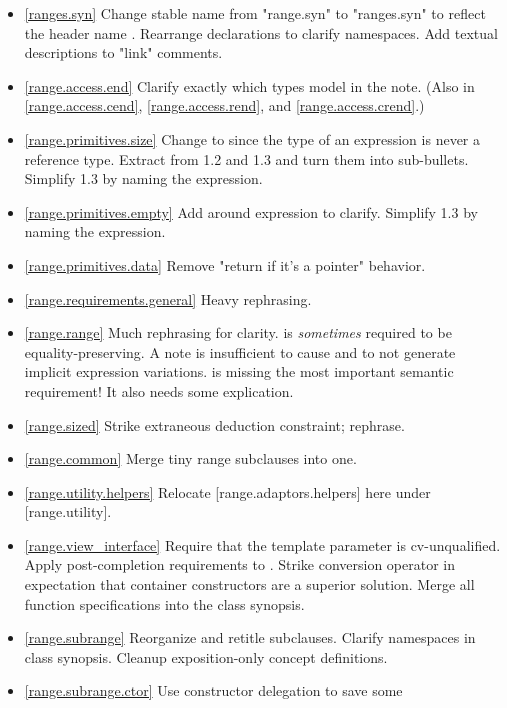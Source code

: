 \begin{itemize}
\item \ref{ranges.syn} Change stable name from "range.syn" to "ranges.syn" to
  reflect the header name .
  Rearrange declarations to clarify namespaces.
  Add textual descriptions to "link" comments.
\item \ref{range.access.end} Clarify exactly which types model 
  in the note. (Also in \ref{range.access.cend}, \ref{range.access.rend},
  and \ref{range.access.crend}.)
\item \ref{range.primitives.size} Change  to
   since the type of an expression is never a reference type.
  Extract  from 1.2 and 1.3 and turn them into
  sub-bullets. Simplify 1.3 by naming the expression.
\item \ref{range.primitives.empty} Add \tcode{()} around expression to clarify.
   Simplify 1.3 by naming the expression.
\item \ref{range.primitives.data}
  Remove "return  if it's a pointer" behavior.
\item \ref{range.requirements.general} Heavy rephrasing.
\item \ref{range.range} Much rephrasing for clarity.
   is \textit{sometimes} required to be equality-preserving.
  A note is insufficient to cause  and 
  to not generate implicit expression variations.
   is missing the most important
  semantic requirement! It also needs some explication.
\item \ref{range.sized} Strike extraneous deduction constraint; rephrase.
\item \ref{range.common} Merge tiny range subclauses into one.
\item \ref{range.utility.helpers} Relocate [range.adaptors.helpers] here
  under [range.utility].
\item \ref{range.view_interface} Require that the template parameter 
  is cv-unqualified. Apply post-completion requirements to .
  Strike conversion operator in expectation that container constructors are a
  superior solution.
  Merge all function specifications into the class synopsis.
\item \ref{range.subrange} Reorganize and retitle subclauses.
  Clarify namespaces in class synopsis.
  Cleanup exposition-only concept definitions.
\item \ref{range.subrange.ctor} Use constructor delegation to save some

\end{itemize}
